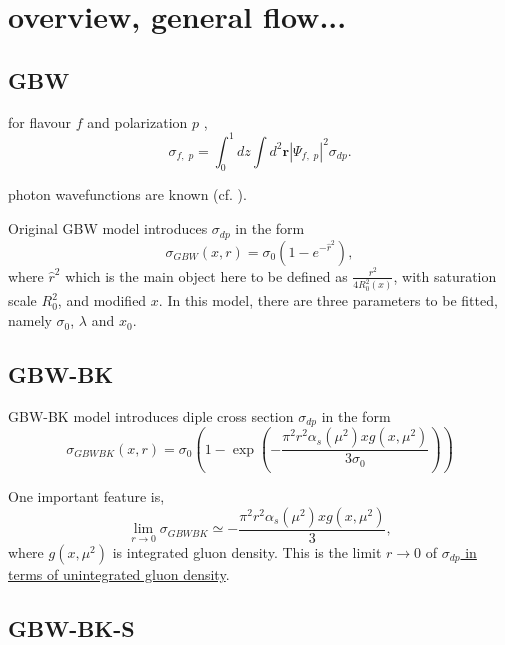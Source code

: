 \section{overview, general flow...}


\subsection{GBW\cite{gbw1998}}
for flavour $f$ and polarization $p$ \cite{gbw1998} \cite{cambqcd},
\begin{equation}
\sigma_{f,\;p}=\int_{0}^{1} d z \int d^2\mathbf{r}|\Psi_{f,\;p}|^2 \sigma_{dp}.
\end{equation}

photon wavefunctions are known (cf.  \cite{gbw1998}).

Original GBW model introduces $\sigma_{dp}$ in the form
\begin{equation}
\sigma_{GBW} (x, r )=\sigma_0 (1-e^{-\hat{r}^2}),
\end{equation}
where $\hat{r}^2$ which is the main object here to be defined as $\frac{r^2}{4 R^2_0(x)}$, with saturation scale \hyperlink{saturationscaleGBW}{$R^2_0$}, and modified \hyperlink{modifiedx}{$x$}.
In this model, there are three parameters to be fitted, namely $\sigma_0$, $\lambda$ and $x_0$.


\subsection{GBW-BK \cite{gbk2002}}
GBW-BK model introduces diple cross section $\sigma_{dp}$ in the form
\begin{equation}
\sigma_{GBWBK}(x,r)=\sigma_0\left(1-\exp\left(-\frac{\pi^2 r^2\alpha_s(\mu^2) x g(x,\mu^2)}{3\sigma_0}\right) \right)
\end{equation}

One important feature is,
\begin{equation}
\lim_{r \rightarrow 0}\sigma_{GBWBK} \simeq  -\frac{\pi^2 r^2\alpha_s(\mu^2) x g(x,\mu^2)}{3},
\end{equation}
where $g(x,\mu^2)$ is integrated gluon density. This is the limit $r \rightarrow 0$ of \hyperlink{ugd}{ $\sigma_{dp}$ in terms of unintegrated gluon density}.
 





\subsection{GBW-BK-S}




